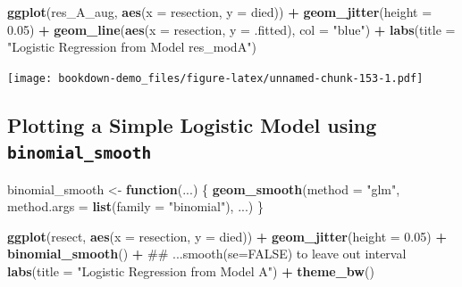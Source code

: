 \documentclass[]{book}
\newenvironment{Shaded}{\begin{snugshade}}{\end{snugshade}}
\newcommand{\KeywordTok}[1]{\textcolor[rgb]{0.13,0.29,0.53}{\textbf{#1}}}
\newcommand{\DataTypeTok}[1]{\textcolor[rgb]{0.13,0.29,0.53}{#1}}
\newcommand{\FloatTok}[1]{\textcolor[rgb]{0.00,0.00,0.81}{#1}}
\newcommand{\StringTok}[1]{\textcolor[rgb]{0.31,0.60,0.02}{#1}}
\newcommand{\ControlFlowTok}[1]{\textcolor[rgb]{0.13,0.29,0.53}{\textbf{#1}}}
\newcommand{\OperatorTok}[1]{\textcolor[rgb]{0.81,0.36,0.00}{\textbf{#1}}}
\newcommand{\NormalTok}[1]{#1}
\theoremstyle{definition}
\theoremstyle{definition}
\theoremstyle{definition}
\theoremstyle{remark}
\begin{document}
\begin{Shaded}
\begin{Highlighting}[]
\KeywordTok{ggplot}\NormalTok{(res_A_aug, }\KeywordTok{aes}\NormalTok{(}\DataTypeTok{x =}\NormalTok{ resection, }\DataTypeTok{y =}\NormalTok{ died)) }\OperatorTok{+}
\StringTok{    }\KeywordTok{geom_jitter}\NormalTok{(}\DataTypeTok{height =} \FloatTok{0.05}\NormalTok{) }\OperatorTok{+}
\StringTok{    }\KeywordTok{geom_line}\NormalTok{(}\KeywordTok{aes}\NormalTok{(}\DataTypeTok{x =}\NormalTok{ resection, }\DataTypeTok{y =}\NormalTok{ .fitted), }
              \DataTypeTok{col =} \StringTok{"blue"}\NormalTok{) }\OperatorTok{+}
\StringTok{    }\KeywordTok{labs}\NormalTok{(}\DataTypeTok{title =} \StringTok{"Logistic Regression from Model res_modA"}\NormalTok{)}
\end{Highlighting}
\end{Shaded}

\texttt{[image: bookdown-demo\_files/figure-latex/unnamed-chunk-153-1.pdf]}

\subsection{\texorpdfstring{Plotting a Simple Logistic Model using
\texttt{binomial\_smooth}}{Plotting a Simple Logistic Model using binomial\_smooth}}\label{plotting-a-simple-logistic-model-using-binomial_smooth}

\begin{Shaded}
\begin{Highlighting}[]
\NormalTok{binomial_smooth <-}\StringTok{ }\ControlFlowTok{function}\NormalTok{(...) \{}
  \KeywordTok{geom_smooth}\NormalTok{(}\DataTypeTok{method =} \StringTok{"glm"}\NormalTok{, }
              \DataTypeTok{method.args =} \KeywordTok{list}\NormalTok{(}\DataTypeTok{family =} \StringTok{"binomial"}\NormalTok{), ...)}
\NormalTok{\}}

\KeywordTok{ggplot}\NormalTok{(resect, }\KeywordTok{aes}\NormalTok{(}\DataTypeTok{x =}\NormalTok{ resection, }\DataTypeTok{y =}\NormalTok{ died)) }\OperatorTok{+}
\StringTok{  }\KeywordTok{geom_jitter}\NormalTok{(}\DataTypeTok{height =} \FloatTok{0.05}\NormalTok{) }\OperatorTok{+}
\StringTok{  }\KeywordTok{binomial_smooth}\NormalTok{() }\OperatorTok{+}\StringTok{ }\NormalTok{## ...smooth(se=FALSE) to leave out interval}
\StringTok{  }\KeywordTok{labs}\NormalTok{(}\DataTypeTok{title =} \StringTok{"Logistic Regression from Model A"}\NormalTok{) }\OperatorTok{+}
\StringTok{  }\KeywordTok{theme_bw}\NormalTok{()}
\end{Highlighting}
\end{Shaded}
\end{document}
